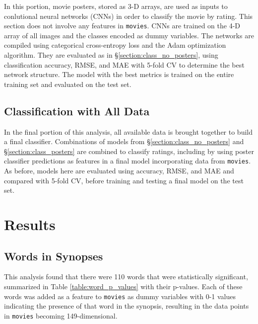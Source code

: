 \documentclass[12pt, oneside]{article}   	%
\begin{document}
In this portion, movie posters, stored as 3-D arrays, are used as inputs to conlutional neural networks (CNNs) in order to classify the movie by rating. This section does not involve any features in \texttt{movies}. CNNs are trained on the 4-D array of all images and the classes encoded as dummy variables. The networks are compiled using categorical cross-entropy loss and the Adam optimization algorithm. They are evaluated as in \S \ref{section:class_no_posters}, using classification accuracy, RMSE, and MAE with 5-fold CV to determine the best network structure. The model with the best metrics is trained on the entire training set and evaluated on the test set.

\subsection{Classification with All Data}

In the final portion of this analysis, all available data is brought together to build a final classifier. Combinations of models from \S \ref{section:class_no_posters} and \S \ref{section:class_posters} are combined to classify ratings, including by using poster classifier predictions as features in a final model incorporating data from \texttt{movies}. As before, models here are evaluated using accuracy, RMSE, and MAE and compared with 5-fold CV, before training and testing a final model on the test set.

\section{Results}

\subsection{Words in Synopses}

This analysis found that there were 110 words that were statistically significant, summarized in Table \ref{table:word_p_values} with their p-values. Each of these words was added as a feature to \texttt{movies} as dummy variables with 0-1 values indicating the presence of that word in the synopsis, resulting in the data points in \texttt{movies} becoming 149-dimensional.
\end{document}
